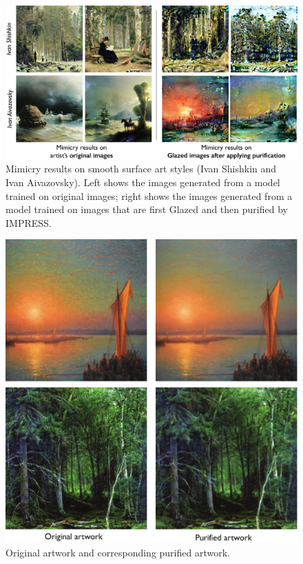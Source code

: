 \begin{figure}
  \centering
  \includegraphics[width=0.99\linewidth]{smooth.pdf}
  \vspace{-0.1in}
  \caption{Mimicry results on smooth surface art styles (Ivan Shishkin and Ivan Aivazovsky). Left shows the images generated from a model trained on original images; right shows the images generated from a model trained on images that are first Glazed and then purified by IMPRESS. }
   \label{fig:smooth}
  \vspace{-0.in}
\end{figure}

\begin{figure}
  \centering
  \includegraphics[width=0.95\linewidth]{clean-degrade.pdf}
  \vspace{-0.1in}
  \caption{Original artwork and corresponding purified artwork. }
  \label{fig:clean}
  \vspace{-0.in}
\end{figure}

